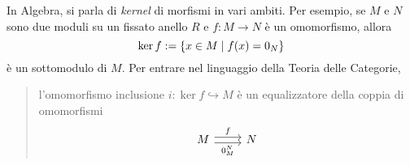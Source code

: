 \begin{example}
  In Algebra, si parla di {\em kernel} di morfismi in vari ambiti. Per
  esempio, se \(M\) e \(N\) sono due moduli su un fissato anello \(R\)
  e \(f : M \to N\) è un omomorfismo, allora
  \[
    \ker f := \left\{x \in M \mid f(x) = 0_N\right\}
  \]
  è un sottomodulo di \(M\). Per entrare nel linguaggio della {\sc
    Teoria delle Categorie},
  \begin{quotation}
    l'omomorfismo inclusione \(i : \ker f \hookrightarrow M\) è un equalizzatore
    della coppia di omomorfismi
    \[
      \begin{tikzcd}
        M \ar["f", shift left, r] \ar["{0_M^N}", shift right, swap, r]
        & N
      \end{tikzcd}
    \]
  \end{quotation}
\end{example}

